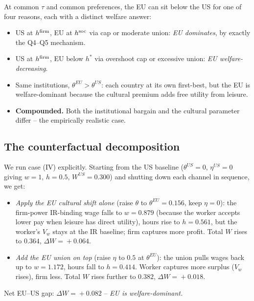 \documentclass[11pt,a4paper]{article}
\begin{document}
At common $\tau$ and common preferences, the EU can sit below the US
for one of four reasons, each with a distinct welfare answer:

\begin{itemize}
\item[\textbf{(I)}] US at $h^{\rm firm}$, EU at $h^{\rm soc}$ via cap or
moderate union: \emph{EU dominates}, by exactly the Q4--Q5 mechanism.
\item[\textbf{(II)}] US at $h^{\rm firm}$, EU below $h^\ast$ via overshoot
cap or excessive union: \emph{EU welfare-decreasing}.
\item[\textbf{(III)}] Same institutions, $\theta^{EU}\!>\!\theta^{US}$:
each country at its own first-best, but the EU is welfare-dominant
because the cultural premium adds free utility from leisure.
\item[\textbf{(IV)}] \textbf{Compounded.} Both the institutional bargain
and the cultural parameter differ -- the empirically realistic case.
\end{itemize}

\subsection{The counterfactual decomposition}

We run case (IV) explicitly. Starting from the US baseline
($\theta^{US}\!=\!0$, $\eta^{US}\!=\!0$ giving $w\!=\!1$, $h\!=\!0.5$,
$W^{US}\!=\!0.300$) and shutting down each channel in sequence, we get:

\begin{itemize}
\item \emph{Apply the EU cultural shift alone}
(raise $\theta$ to $\theta^{EU}\!=\!0.156$, keep $\eta\!=\!0$): the
firm-power IR-binding wage falls to $w\!=\!0.879$ (because the worker
accepts lower pay when leisure has direct utility), hours rise to
$h\!=\!0.561$, but the worker's $V_w$ stays at the IR baseline; firm
captures more profit. Total $W$ rises to $0.364$, $\Delta W\!=\!+0.064$.
\item \emph{Add the EU union on top} (raise $\eta$ to $0.5$ at
$\theta^{EU}$): the union pulls wages back up to $w\!=\!1.172$, hours
fall to $h\!=\!0.414$. Worker captures more surplus ($V_w$ rises),
firm less. Total $W$ rises further to $0.382$, $\Delta W\!=\!+0.018$.
\end{itemize}
Net EU--US gap: $\Delta W\!=\!+0.082$ -- \emph{EU is welfare-dominant.}
\end{document}

